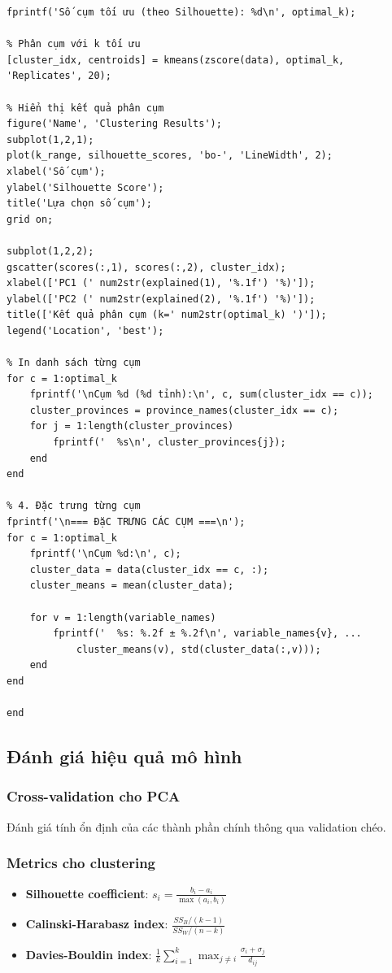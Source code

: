 \begin{matlab}
\begin{lstlisting}
fprintf('Số cụm tối ưu (theo Silhouette): %d\n', optimal_k);

% Phân cụm với k tối ưu
[cluster_idx, centroids] = kmeans(zscore(data), optimal_k, 'Replicates', 20);

% Hiển thị kết quả phân cụm
figure('Name', 'Clustering Results');
subplot(1,2,1);
plot(k_range, silhouette_scores, 'bo-', 'LineWidth', 2);
xlabel('Số cụm');
ylabel('Silhouette Score');
title('Lựa chọn số cụm');
grid on;

subplot(1,2,2);
gscatter(scores(:,1), scores(:,2), cluster_idx);
xlabel(['PC1 (' num2str(explained(1), '%.1f') '%)']);
ylabel(['PC2 (' num2str(explained(2), '%.1f') '%)']);
title(['Kết quả phân cụm (k=' num2str(optimal_k) ')']);
legend('Location', 'best');

% In danh sách từng cụm
for c = 1:optimal_k
    fprintf('\nCụm %d (%d tỉnh):\n', c, sum(cluster_idx == c));
    cluster_provinces = province_names(cluster_idx == c);
    for j = 1:length(cluster_provinces)
        fprintf('  %s\n', cluster_provinces{j});
    end
end

% 4. Đặc trưng từng cụm
fprintf('\n=== ĐặC TRƯNG CÁC CỤM ===\n');
for c = 1:optimal_k
    fprintf('\nCụm %d:\n', c);
    cluster_data = data(cluster_idx == c, :);
    cluster_means = mean(cluster_data);
    
    for v = 1:length(variable_names)
        fprintf('  %s: %.2f ± %.2f\n', variable_names{v}, ...
            cluster_means(v), std(cluster_data(:,v)));
    end
end

end
\end{lstlisting}
\end{matlab}

\subsection{Đánh giá hiệu quả mô hình}
\subsubsection*{Cross-validation cho PCA}
Đánh giá tính ổn định của các thành phần chính thông qua validation chéo.

\subsubsection*{Metrics cho clustering}
\begin{itemize}
    \item \textbf{Silhouette coefficient}: $s_i = \frac{b_i - a_i}{\max(a_i, b_i)}$
    \item \textbf{Calinski-Harabasz index}: $\frac{SS_B/(k-1)}{SS_W/(n-k)}$
    \item \textbf{Davies-Bouldin index}: $\frac{1}{k}\sum_{i=1}^k \max_{j \neq i} \frac{\sigma_i + \sigma_j}{d_{ij}}$
\end{itemize}

